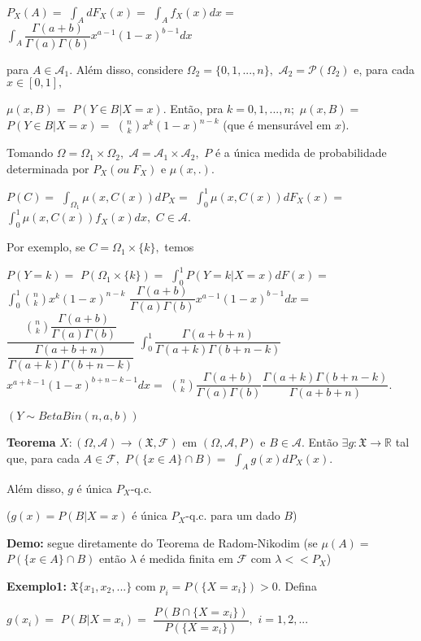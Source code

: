 \documentclass[
]{book}
\begin{document}
\(P_X(A)=\) \(\int_A dF_X(x)=\) \(\int_A f_X(x)dx=\) \(\int_A \dfrac{\Gamma(a+b)}{\Gamma(a)\Gamma(b)}x^{a-1}(1-x)^{b-1}dx\)

para \(A \in \mathcal{A}_1.\) Além disso, considere \(\Omega_2=\{0,1,...,n\},\) \(\mathcal{A}_2=\mathcal{P}(\Omega_2)\) e, para cada \(x \in [0,1],\)

\(\mu(x,B)=\) \(P(Y \in B| X=x).\) Então, pra \(k=0,1,...,n;\) \(\mu(x,B)=\) \(P(Y\in B| X=x)=\) \(\binom{n}{k}x^k(1-x)^{n-k}\) (que é mensurável em \(x\)).

Tomando \(\Omega=\Omega_1 \times \Omega_2,\) \(\mathcal{A}=\mathcal{A}_1 \times \mathcal{A}_2,\) \(P\) é a única medida de probabilidade determinada por \(P_X (ou \; F_X)\) e \(\mu(x,.).\)

\(P(C)=\) \(\int_{\Omega_1}\mu(x,C(x))dP_X=\) \(\int_0^1 \mu(x,C(x))dF_X(x)=\) \(\int_0^1 \mu(x,C(x))f_X(x)dx,\) \(C \in\mathcal{A}.\)

Por exemplo, se \(C=\Omega_1 \times \{k\},\) temos

\(P(Y=k)=\) \(P(\Omega_1 \times \{k\})=\) \(\int_0^1P(Y=k|X=x)dF(x)=\) \(\int_0^1 \binom{n}{k}x^k(1-x)^{n-k}\) \(\dfrac{\Gamma(a+b)}{\Gamma(a)\Gamma(b)}x^{a-1}(1-x)^{b-1}dx=\) \(\dfrac{\binom{n}{k}\dfrac{\Gamma(a+b)}{\Gamma(a)\Gamma(b)}}{\dfrac{\Gamma(a+b+n)}{\Gamma(a+k)\Gamma(b+n-k)}}\) \(\int_0^1\dfrac{\Gamma(a+b+n)}{\Gamma(a+k)\Gamma(b+n-k)}\) \(x^{a+k-1}(1-x)^{b+n-k-1}dx=\) \(\binom{n}{k}\dfrac{\Gamma(a+b)}{\Gamma(a)\Gamma(b)}\dfrac{\Gamma(a+k)\Gamma(b+n-k)}{\Gamma(a+b+n)}.\)

\((Y \sim Beta Bin (n,a,b))\)

\textbf{Teorema} \(X: (\Omega,\mathcal{A}) \longrightarrow (\mathfrak{X},\mathcal{F})\) em \((\Omega,\mathcal{A},P)\) e \(B \in \mathcal{A}.\) Então \(\exists g:\mathfrak{X} \longrightarrow \mathbb{R}\) tal que, para cada \(A \in \mathcal{F},\) \(P(\{x\in A\}\cap B)=\) \(\int_Ag(x)dP_X(x).\)

Além disso, \(g\) é única \(P_X\)-q.c.

(\(g(x)=P(B|X=x)\) é única \(P_X\)-q.c. para um dado \(B\))

\textbf{Demo:} segue diretamente do Teorema de Radom-Nikodim (se \(\mu(A)=\) \(P(\{x\in A\}\cap B)\) então \(\lambda\) é medida finita em \(\mathcal{F}\) com \(\lambda << P_X\))

\textbf{Exemplo1:} \(\mathfrak{X}\{x_1,x_2,...\}\) com \(p_i=P(\{X=x_i\})>0.\) Defina

\(g(x_i)=\) \(P(B|X=x_i)=\) \(\dfrac{P(B\cap \{X=x_i\})}{P(\{X=x_i\})},\) \(i=1,2,...\)
\end{document}
